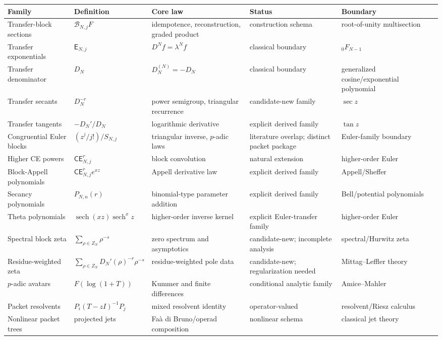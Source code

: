 \documentclass[11pt]{article}
\theoremstyle{definition}
\theoremstyle{remark}
\newcommand{\EE}{\mathsf E}
\newcommand{\CE}{\mathsf{CE}}
\newcommand{\sech}{\operatorname{sech}}
\begin{document}
\begingroup
\scriptsize
\setlength{\tabcolsep}{3pt}
\begin{longtable}{@{}p{.16\linewidth}p{.17\linewidth}p{.19\linewidth}p{.16\linewidth}p{.14\linewidth}@{}}
\toprule
Family & Definition & Core law & Status & Boundary\\
\midrule
\endhead
Transfer-block sections & $\mathcal B_{N,j}F$ & idempotence, reconstruction, graded product & construction schema & root-of-unity multisection\\
Transfer exponentials & $\EE_{N,j}$ & $D^Nf=\lambda^Nf$ & classical boundary & ${}_0F_{N-1}$\\
Transfer denominator & $D_N$ & $D_N^{(N)}=-D_N$ & classical boundary & generalized cosine/exponential polynomial\\
Transfer secants & $D_N^{-r}$ & power semigroup, triangular recurrence & candidate-new family & $\sec z$\\
Transfer tangents & $-D_N'/D_N$ & logarithmic derivative & explicit derived family & $\tan z$\\
Congruential Euler blocks & $(z^j/j!)/S_{N,j}$ & triangular inverse, $p$-adic laws & literature overlap; distinct packet package & Euler-family boundary\\
Higher CE powers & $\CE_{N,j}^r$ & block convolution & natural extension & higher-order Euler\\
Block-Appell polynomials & $\CE_{N,j}^re^{xz}$ & Appell derivative law & explicit derived family & Appell/Sheffer\\
Secancy polynomials & $P_{N,n}(r)$ & binomial-type parameter addition & explicit derived family & Bell/potential polynomials\\
Theta polynomials & $\sech(xz)\sech^xz$ & higher-order inverse kernel & explicit Euler-transfer family & higher-order Euler\\
Spectral block zeta & $\sum_{\rho\in Z_N}\rho^{-s}$ & zero spectrum and asymptotics & candidate-new; incomplete analysis & spectral/Hurwitz zeta\\
Residue-weighted zeta & $\sum_{\rho\in Z_N}D_N'(\rho)^{-r}\rho^{-s}$ & residue-weighted pole data & candidate-new; regularization needed & Mittag--Leffler theory\\
$p$-adic avatars & $F(\log(1+T))$ & Kummer and finite differences & conditional analytic family & Amice--Mahler\\
Packet resolvents & $P_i(T-zI)^{-1}P_j$ & mixed resolvent identity & operator-valued & resolvent/Riesz calculus\\
Nonlinear packet trees & projected jets & Faà di Bruno/operad composition & nonlinear schema & classical jet theory\\
\bottomrule
\end{longtable}
\endgroup
\end{document}
